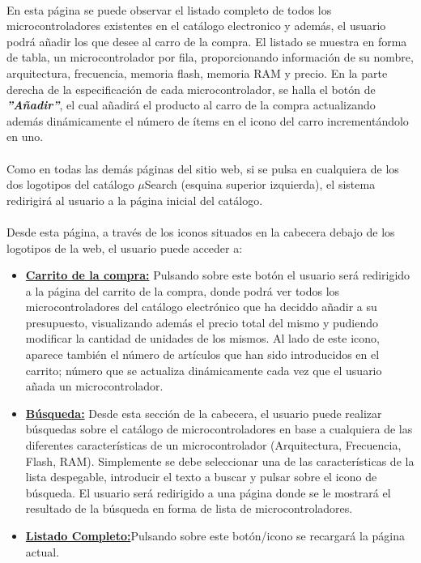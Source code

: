 \paragraph{}En esta página se puede observar el listado completo de todos los microcontroladores existentes en el catálogo electronico y además, el usuario podrá añadir los que desee al carro de la compra. El listado se muestra en forma de tabla, un microcontrolador por fila, proporcionando información de su nombre, arquitectura, frecuencia, memoria flash, memoria RAM y precio. En la parte derecha de la especificación de cada microcontrolador, se halla el botón de \textbf{\textit{''Añadir''}}, el cual añadirá el producto al carro de la compra actualizando además dinámicamente el número de ítems en el icono del carro incrementándolo en uno.

\paragraph{}Como en todas las demás páginas del sitio web, si se pulsa en cualquiera de los dos logotipos del catálogo $\mu$Search (esquina superior izquierda), el sistema redirigirá al usuario a la página inicial del catálogo.

\paragraph{}Desde esta página, a través de los iconos situados en la cabecera debajo de los logotipos de la web, el usuario puede acceder a:

\begin{itemize}
	\item \underline{\textbf{Carrito de la compra:}} Pulsando sobre este botón el usuario será redirigido a la página del carrito de la compra, donde podrá ver todos los microcontroladores del catálogo electrónico que ha deciddo añadir a su presupuesto, visualizando además el precio total del mismo y pudiendo modificar la cantidad de unidades de los mismos.
	Al lado de este icono, aparece también el número de artículos que han sido introducidos en el carrito; número que se actualiza dinámicamente cada vez que el usuario añada un microcontrolador.
	
	\item \underline{\textbf{Búsqueda:}} Desde esta sección de la cabecera, el usuario puede realizar búsquedas sobre el catálogo de microcontroladores en base a cualquiera de las diferentes características de un microcontrolador (Arquitectura, Frecuencia, Flash, RAM). Simplemente se debe seleccionar una de las características de la lista despegable, introducir el texto a buscar y pulsar sobre el icono de búsqueda.
	El usuario será redirigido a una página donde se le mostrará el resultado de la búsqueda en forma de lista de microcontroladores.
		
	\item \underline{\textbf{Listado Completo:}}Pulsando sobre este botón/icono se recargará la página actual.
\end{itemize}